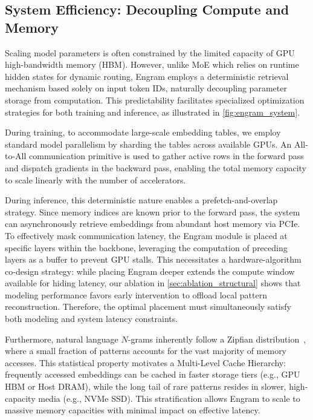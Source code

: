 \subsection{System Efficiency: Decoupling Compute and Memory}
\label{sec:system_efficiency}

Scaling model parameters is often constrained by the limited capacity of GPU high-bandwidth memory (HBM). However, unlike MoE which relies on runtime hidden states for dynamic routing, Engram employs a deterministic retrieval mechanism based solely on input token IDs, naturally decoupling parameter storage from computation. This predictability facilitates specialized optimization strategies for both training and inference, as illustrated in \autoref{fig:engram_system}.

During training, to accommodate large-scale embedding tables, we employ standard model parallelism by sharding the tables across available GPUs. An All-to-All communication primitive is used to gather active rows in the forward pass and dispatch gradients in the backward pass, enabling the total memory capacity to scale linearly with the number of accelerators.

During inference, this deterministic nature enables a prefetch-and-overlap strategy. Since memory indices are known prior to the forward pass, the system can asynchronously retrieve embeddings from abundant host memory via PCIe. To effectively mask communication latency, the Engram module is placed at specific layers within the backbone, leveraging the computation of preceding layers as a buffer to prevent GPU stalls.
This necessitates a hardware-algorithm co-design strategy: while placing Engram deeper extends the compute window available for hiding latency, our ablation in \autoref{sec:ablation_structural} shows that modeling performance favors early intervention to offload local pattern reconstruction. Therefore, the optimal placement must simultaneously satisfy both modeling and system latency constraints.


Furthermore, natural language $N$-grams inherently follow a Zipfian distribution~\citep{piantadosi2014zipf,Chao1950HumanBA}, where a small fraction of patterns accounts for the vast majority of memory accesses. This statistical property motivates a Multi-Level Cache Hierarchy: frequently accessed embeddings can be cached in faster storage tiers (e.g., GPU HBM or Host DRAM), while the long tail of rare patterns resides in slower, high-capacity media (e.g., NVMe SSD). This stratification allows Engram to scale to massive memory capacities with minimal impact on effective latency.